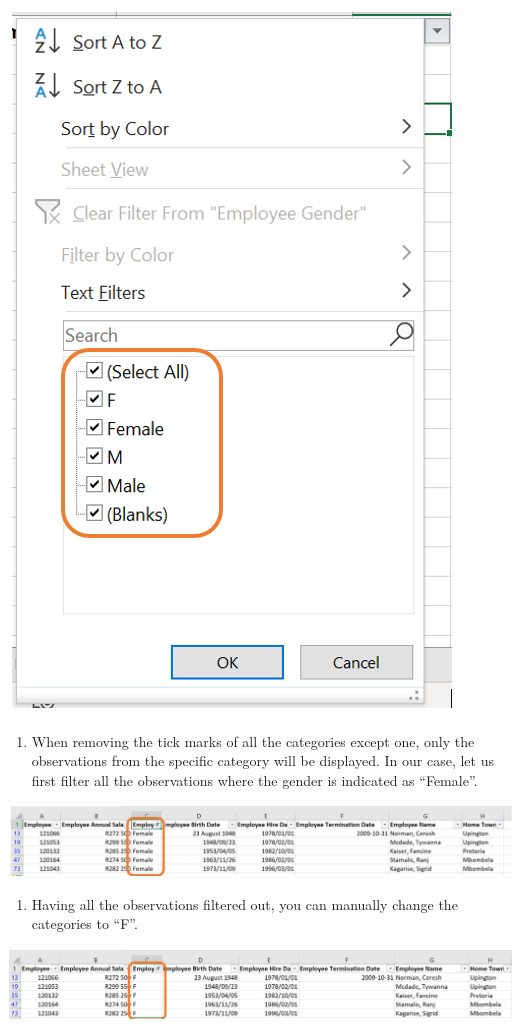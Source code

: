 \documentclass[
]{book}
\providecommand{\tightlist}{%
  \setlength{\itemsep}{0pt}\setlength{\parskip}{0pt}}
\begin{document}
\begin{center}\includegraphics[width=0.4\linewidth]{Figures/cleaning_categories_2} \end{center}

\begin{enumerate}
\def\labelenumi{\arabic{enumi}.}
\setcounter{enumi}{2}
\tightlist
\item
  When removing the tick marks of all the categories except one, only the observations from the specific category will be displayed. In our case, let us first filter all the observations where the gender is indicated as ``Female''.
\end{enumerate}

\begin{center}\includegraphics[width=0.7\linewidth]{Figures/cleaning_categories_3} \end{center}

\begin{enumerate}
\def\labelenumi{\arabic{enumi}.}
\setcounter{enumi}{3}
\tightlist
\item
  Having all the observations filtered out, you can manually change the categories to ``F''.
\end{enumerate}

\begin{center}\includegraphics[width=0.7\linewidth]{Figures/cleaning_categories_4} \end{center}
\end{document}
